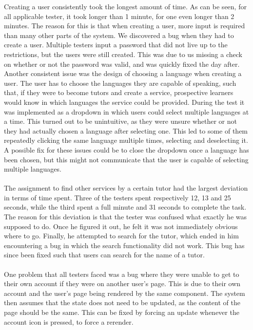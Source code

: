 Creating a user consistently took the longest amount of time.
As can be seen, for all applicable tester, it took longer than 1 minute, for one even longer than 2 minutes.
The reason for this is that when creating a user, more input is required than many other parts of the system.
We discovered a bug when they had to create a user. 
Multiple testers input a password that did not live up to the restrictions, but the users were still created. 
This was due to us missing a check on whether or not the password was valid, and was quickly fixed the day after.
Another consistent issue was the design of choosing a language when creating a user.
The user has to choose the languages they are capable of speaking, such that, if they were to become tutors and create a service, prospective learners would know in which languages the service could be provided.
During the test it was implemented as a dropdown in which users could select multiple languages at a time.
This turned out to be unintuitive, as they were unsure whether or not they had actually chosen a language after selecting one.
This led to some of them repeatedly clicking the same language multiple times, selecting and deselecting it.
A possible fix for these issues could be to close the dropdown once a language has been chosen, but this might not communicate that the user is capable of selecting multiple languages.
\\\\
The assignment to find other services by a certain tutor had the largest deviation in terms of time spent.
Three of the testers spent respectively 12, 13 and 25 seconds, while the third spent a full minute and 31 seconds to complete the task.
The reason for this deviation is that the tester was confused what exactly he was supposed to do.
Once he figured it out, he felt it was not immediately obvious where to go.
Finally, he attempted to search for the tutor, which ended in him encountering a bug in which the search functionality did not work.
This bug has since been fixed such that users can search for the name of a tutor.
\\\\
One problem that all testers faced was a bug where they were unable to get to their own account if they were on another user's page.
This is due to their own account and the user's page being rendered by the same component.
The system then assumes that the state does not need to be updated, as the content of the page should be the same.
This can be fixed by forcing an update whenever the account icon is pressed, to force a rerender.
